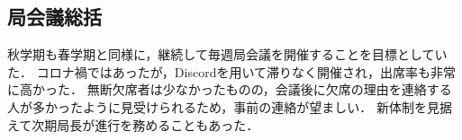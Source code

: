 \subsection*{局会議総括}


秋学期も春学期と同様に，継続して毎週局会議を開催することを目標としていた．
コロナ禍ではあったが，Discordを用いて滞りなく開催され，出席率も非常に高かった．
無断欠席者は少なかったものの，会議後に欠席の理由を連絡する人が多かったように見受けられるため，事前の連絡が望ましい．
新体制を見据えて次期局長が進行を務めることもあった．

